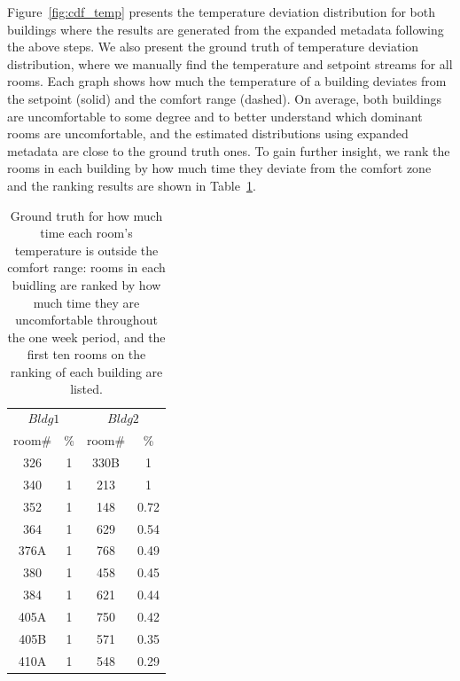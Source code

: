Figure~\ref{fig:cdf_temp} presents the temperature deviation distribution for both buildings where the results are generated from the expanded metadata following the above steps. We also present the ground truth of temperature deviation distribution, where we manually find the temperature and setpoint streams for all rooms. Each graph shows how much the temperature of a building deviates from the setpoint (solid) and the comfort range (dashed). On average, both buildings are uncomfortable to some degree and to better understand which dominant rooms are uncomfortable, and the estimated distributions using expanded metadata are close to the ground truth ones. To gain further insight, we rank the rooms in each building by how much time they deviate from the comfort zone and the ranking results are shown in Table~\ref{tab:uncmft}.

\begin{table}[h]
 \begin{center}
	\begin{tabular}{|c|c|c|c|}
	\multicolumn{2}{c}{$Bldg 1$}
	 & \multicolumn{2}{c}{$Bldg 2$}\\
	\cline{1-4} 
	 room\# & \% & room\# & \%\\
	\cline{1-4}
	 326 & 1 & 330B & 1\\
	\cline{1-4}
	 340 & 1 & 213 & 1\\
	\cline{1-4}
	352 & 1 & 148 & 0.72\\
	\cline{1-4}
	364 & 1 & 629 & 0.54\\
	\cline{1-4}
	376A & 1 & 768 & 0.49\\
	\cline{1-4}
	380 & 1 & 458 & 0.45\\
	\cline{1-4}
	384 & 1 & 621 & 0.44\\
	\cline{1-4}
	405A & 1 & 750 & 0.42\\
	\cline{1-4}
	405B & 1 & 571 & 0.35\\
	\cline{1-4}
	410A & 1 & 548 & 0.29\\
	\cline{1-4}
	\end{tabular}
 \end{center}
 \caption{Ground truth for how much time each room's temperature is outside the comfort range: rooms in each buidling are ranked by how much time they are uncomfortable throughout the one week period, and the first ten rooms on the ranking of each building are listed.}
 \label{tab:uncmft}
\end{table}

